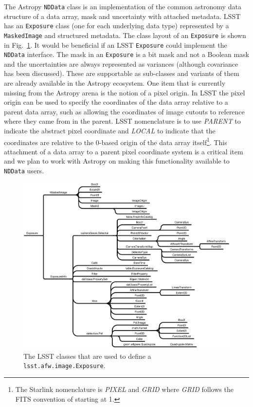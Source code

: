 \documentclass[]{spie}  %
\begin{document}
The Astropy \texttt{NDData} class is an implementation of the common astronomy data structure\cite{2015A&C....12..146J} of a data array, mask and uncertainty with attached metadata.
LSST has an \texttt{Exposure} class (one for each underlying data type) represented by a \texttt{MaskedImage} and structured metadata.
The class layout of an \texttt{Exposure} is shown in Fig.~\ref{fig:exposure}.
It would be beneficial if an LSST \texttt{Exposure} could implement the \texttt{NDData} interface.
The mask in an \texttt{Exposure} is a bit mask and not a Boolean mask and the uncertainties are always represented as variances (although covariance has been discussed).
These are supportable as sub-classes and variants of them are already available in the Astropy ecosystem.
One item that is currently missing from the Astropy arena is the notion of a pixel origin.
In LSST the pixel origin can be used to specify the coordinates of the data array relative to a parent data array, such as allowing the coordinates of image cutouts to reference where they came from in the parent.
LSST nomenclature is to use \emph{PARENT} to indicate the abstract pixel coordinate and \emph{LOCAL} to indicate that the coordinates are relative to the 0-based origin of the data array itself\footnote{The Starlink nomenclature\cite{2015A&C....12..146J} is \emph{PIXEL} and \emph{GRID} where \emph{GRID} follows the FITS convention of starting at 1.}.
This attachment of a data array to a parent pixel coordinate system is a critical item and we plan to work with Astropy on making this functionality available to \texttt{NDData} users.

\begin{figure} [t]
\begin{center}
\includegraphics[width=\textwidth]{exposure-dependencies}
\end{center}
\caption[layers]
{\label{fig:exposure}
The LSST classes that are used to define a \texttt{lsst.afw.image.Exposure}.}
\end{figure}
\end{document}
